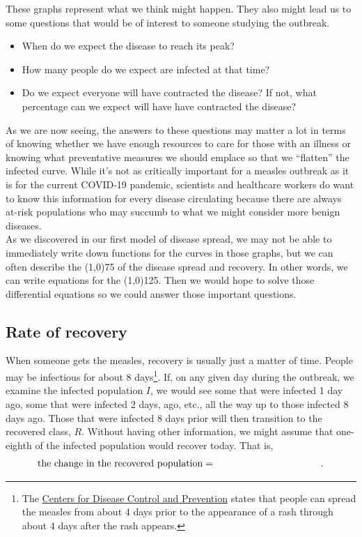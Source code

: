 \documentclass[12pt]{article}
\newcommand{\<}{\langle}
\renewcommand{\>}{\rangle}
\begin{document}
\noindent These graphs represent what we think might happen.  They also might lead us to some
questions that would be of interest to someone studying the outbreak.
	\begin{itemize}
	\item  When do we expect the disease to reach its peak?
	\item  How many people do we expect are infected at that time?
	\item  Do we expect everyone will have contracted the disease?  If not, what percentage can we 
		expect will have have contracted the disease?
	\end{itemize}
\newpage
\noindent  As we are now seeing, the answers to these questions may matter a lot in terms of knowing 
whether we have enough resources to care for those with an illness or knowing what preventative
measures we should emplace so that we ``flatten'' the infected curve.  While it's not as critically important
for a measles outbreak as it is for the current COVID-19 pandemic, scientists and healthcare workers 
do want to know this information for every disease circulating because there are always at-risk populations
who may succumb to what we might consider more benign diseases.\\

\noindent  As we discovered in our first model of disease spread, we may not be able to immediately write 
down functions for the curves in those graphs, but we can often describe the 
\line(1,0){75}
of the disease spread and recovery.  In other words, we can write equations for the 
\line(1,0){125}.
Then we would hope to solve those differential equations so we could answer those important questions.\\

\subsection*{Rate of recovery}
\noindent  When someone gets the measles, recovery is usually just a matter of time.  People may be 
infectious for about 8 days\footnote{The \href{https://www.cdc.gov/measles/transmission.html}{Centers 
for Disease Control and Prevention} states that people can spread the measles from about 4 days prior to 
the appearance of a rash through about 4 days after the rash appears.}.  If, on any given day during the
outbreak, we examine the infected population $I$, we would see some that were infected 1 day ago,
some that were infected 2 days, ago, etc., all the way up to those infected 8 days ago.  Those that were 
infected 8 days prior will then transition to the recovered class, $R$.  Without having other information, we
might assume that one-eighth of the infected population would recover today.  That is,
\[ \mbox{the change in the recovered population} = \mbox{\hspace{1.5in}}. \]
	
\end{document}
